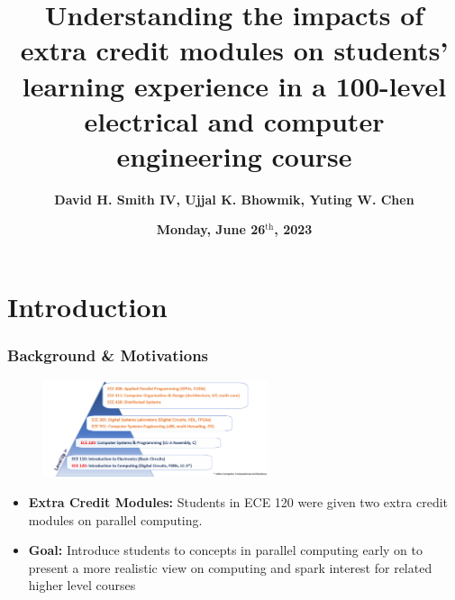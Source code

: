 \documentclass{beamer}
\title[Understanding the impacts of EC]{\textbf{Understanding the impacts of extra credit modules on students’ learning experience in a 100-level electrical and computer engineering course}}
\author[D.H Smith IV \textit{et al.}]{\textbf{David H. Smith IV, Ujjal K. Bhowmik, Yuting W. Chen}}
\institute[\textbf{UIUC}]{\textbf{University of Illinois Urbana-Champaign}}
\date{\textbf{Monday, June 26$^{\text{th}}$, 2023}}
\begin{document}
\frame{\titlepage}

\section{Introduction}

\begin{frame}
  \frametitle{Background \& Motivations}

  \begin{figure}
      \centering
      \includegraphics[width=250px]{courses.png}
  \end{figure}
  \vfill
  \begin{itemize}
    \item \textbf{Extra Credit Modules: } Students in ECE 120 were given two extra credit modules on parallel computing.
    \item \textbf{Goal:} Introduce students to concepts in parallel computing early on to present a more realistic view on computing and spark interest for related higher level courses
  \end{itemize}
\end{frame}
\end{document}

